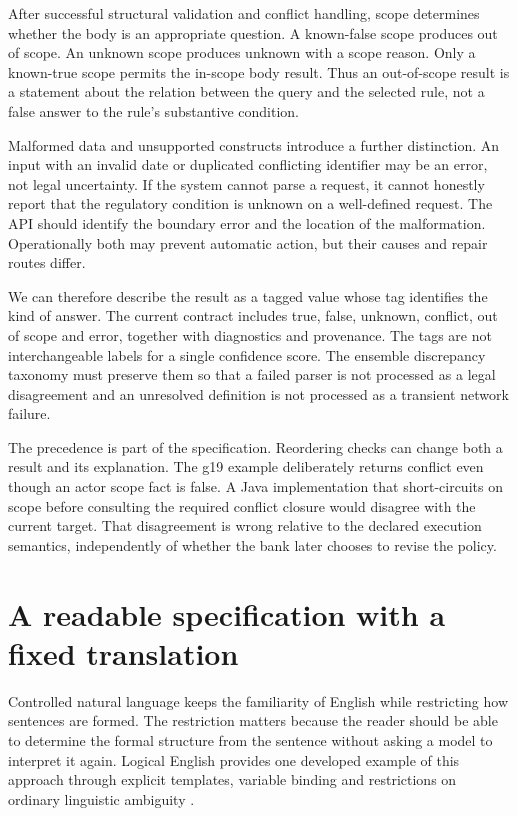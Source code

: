 After successful structural validation and conflict handling, scope determines
whether the body is an appropriate question. A known-false scope produces out
of scope. An unknown scope produces unknown with a scope reason. Only a
known-true scope permits the in-scope body result. Thus an out-of-scope result
is a statement about the relation between the query and the selected rule,
not a false answer to the rule's substantive condition.


Malformed data and unsupported constructs introduce a further distinction.
An input with an invalid date or duplicated conflicting identifier may be an
error, not legal uncertainty. If the system cannot parse a request, it cannot
honestly report that the regulatory condition is unknown on a well-defined
request. The API should identify the boundary error and the location of the
malformation. Operationally both may prevent automatic action, but their causes
and repair routes differ.

We can therefore describe the result as a tagged value whose tag identifies
the kind of answer. The current contract includes true, false, unknown,
conflict, out of scope and error, together with diagnostics and provenance.
The tags are not interchangeable labels for a single confidence score. The
ensemble discrepancy taxonomy must preserve them so that a failed parser is
not processed as a legal disagreement and an unresolved definition is not
processed as a transient network failure.

The precedence is part of the specification. Reordering checks can change
both a result and its explanation. The g19 example deliberately returns
conflict even though an actor scope fact is false. A Java implementation that
short-circuits on scope before consulting the required conflict closure would
disagree with the current target. That disagreement is wrong relative to the
declared execution semantics, independently of whether the bank later chooses
to revise the policy.

\section{A readable specification with a fixed translation}
\label{merge:M03:07}

\label{sec:proof-cnl}
Controlled natural language keeps the familiarity of English while restricting
how sentences are formed. The restriction matters because the reader should
be able to determine the formal structure from the sentence without asking a
model to interpret it again. Logical English provides one developed example of
this approach through explicit templates, variable binding and restrictions on
ordinary linguistic ambiguity \citep[language and law examples]{logicalenglish2023}.

